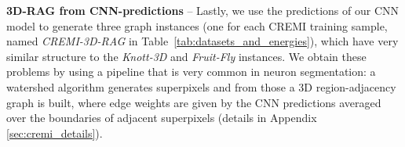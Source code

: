\textbf{3D-RAG from CNN-predictions} -- Lastly, we use the predictions of our CNN model to generate three graph instances (one for each CREMI training sample, named \emph{CREMI-3D-RAG} in Table~\ref{tab:datasets_and_energies}), which have very similar structure to the \emph{Knott-3D} and \emph{Fruit-Fly} instances.  We obtain these problems by using a pipeline that is very common in neuron segmentation: a watershed algorithm generates superpixels and from those a 3D region-adjacency graph is built, where edge weights are given by the CNN predictions averaged over the boundaries of adjacent superpixels (details in Appendix \ref{sec:cremi_details}). 






 


